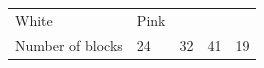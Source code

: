 \begin{enumerate}[noitemsep, label=\textbf{\arabic*}. ]
{\begin{tabular}[t]{|l|l|l|l|l|}
    
        White &
    
    
        Pink%
     \tabularnewline\cline{1-1}\cline{2-2}\cline{3-3}\cline{4-4}\cline{5-5}
    
    
        Number of
blocks &
    
    
        24 &
    
    
        32 &
    
    
        41 &
    
    
        19%
     \tabularnewline\cline{1-1}\cline{2-2}\cline{3-3}\cline{4-4}\cline{5-5}
    \end{tabular}} %
        \addtolength{\mytableboxheight}{\mytableboxdepth}
        \addtocounter{footnote}{-0}
        

\end{enumerate}
